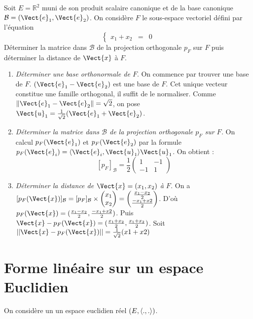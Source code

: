 \documentclass{book}
\begin{document}
\begin{Exemple}
Soit $E=\mathbb R^2$ muni de son produit scalaire canonique et de la base canonique $\mathcal B=(\Vect{e}_1,\Vect{e}_2)$. On considère $F$ le sous-espace vectoriel défini par l'équation 
$$\left\{
\begin{array}{rcl}
x_1+x_2&=&0
\end{array}
\right.
$$
Déterminer la matrice dans $\mathcal B$ de la projection orthogonale $p_F$ sur $F$ puis déterminer la distance de $\Vect{x}$ à $F$.
\begin{enumerate}
\item \textit{Déterminer une base orthonormale de $F$}. On commence par trouver une base de $F$. $(\Vect{e}_1-\Vect{e}_2)$ est une base de $F$. Cet unique vecteur constitue  une famille orthogonal, il suffit de le normaliser. Comme $\norme{\Vect{e}_1-\Vect{e}_2}=\sqrt{2}$, on pose $\Vect{u}_1=\frac{1}{\sqrt 2} (\Vect{e}_1+\Vect{e}_2)$.
\item \textit{Déterminer la matrice dans $\mathcal B$ de la projection orthogonale $p_F$ sur $F$.} On calcul $p_F(\Vect{e}_1)$ et $p_F(\Vect{e}_2)$ par la formule $p_F(\Vect{e}_i)=\PS{\Vect{e}_i}{\Vect{u}_1}\Vect{u}_1$. On obtient :
$$[p_F]_{\mathcal{B}}=\frac{1}{2}\begin{pmatrix}
1 & -1\\
-1 & 1
\end{pmatrix}
$$
\item \textit{Déterminer la distance de $\Vect{x}=(x_1,x_2)$ à $F$.} On a  $[p_F(\Vect{x})]_{\mathcal{B}} = [p_F]_{\mathcal{B}}\times \begin{pmatrix}
x_1\\
x_2
\end{pmatrix}= \begin{pmatrix}
\frac{x_1 -x_2}{2} \\
\frac{-x_1 +x2 }{2}
\end{pmatrix}$. D'où $p_F(\Vect{x})=(\frac{x_1 -x_2}{2},
\frac{-x_1 +x2 }{2})$. Puis $\Vect{x} - p_F(\Vect{x})= (\frac{x_1 +x_2}{2},\frac{x_1 +x_2}{2})$. Soit $||\Vect{x} - p_F(\Vect{x})||=\frac{1}{\sqrt{2}}(x1+x2)$ 
\end{enumerate}

\end{Exemple}

\section{Forme linéaire sur un espace Euclidien}
On considère un un espace euclidien réel $(E,\langle.,.\rangle)$.
\end{document}
